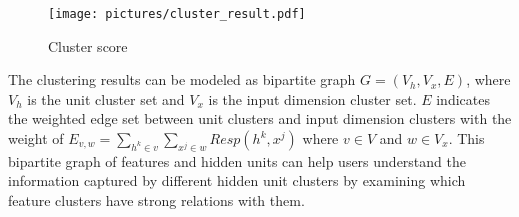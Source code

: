 


\begin{figure}[t]
	\centering
	\texttt{[image: pictures/cluster\_result.pdf]}
	\vspace{-3mm}
	\caption{Cluster score}
	\label{fig:unit_distribution_subgroup}
	\vspace{-4mm}
\end{figure}



The clustering results can be modeled as bipartite graph $G = (V_h, V_x, E)$, where $V_h$ is the unit cluster set and $V_x$ is the input dimension cluster set. 
$E$ indicates the weighted edge set between unit clusters and input dimension clusters with the weight of $E_{v,w} = \displaystyle\sum_{h^k \in v}\displaystyle\sum_{x^j \in w}Resp(h^k, x^j)$ where $v \in V$ and $w \in V_x$. 
This bipartite graph of features and hidden units can help users understand the information captured by different hidden unit clusters by examining which feature clusters have strong relations with them.

